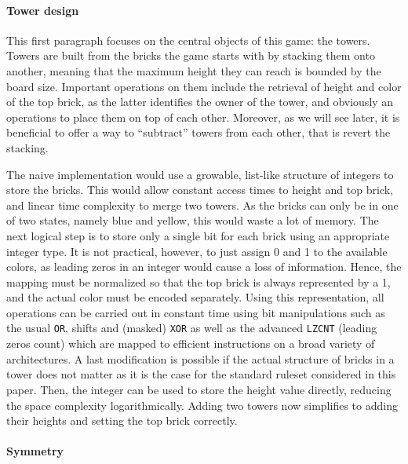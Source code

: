 \documentclass[sigconf]{acmart}
\begin{document}
\paragraph{Tower design}
This first paragraph focuses on the central objects of this game: the towers.
Towers are built from the bricks the game starts with by stacking them onto another, meaning that the maximum height they can reach is bounded by the board size.
Important operations on them include the retrieval of height and color of the top brick, as the latter identifies the owner of the tower, and obviously an operations to place them on top of each other.
Moreover, as we will see later, it is beneficial to offer a way to \enquote{subtract} towers from each other, that is revert the stacking.

The naive implementation would use a growable, list-like structure of integers to store the bricks.
This would allow constant access times to height and top brick, and linear time complexity to merge two towers.
As the bricks can only be in one of two states, namely blue and yellow, this would waste a lot of memory.
The next logical step is to store only a single bit for each brick using an appropriate integer type.
It is not practical, however, to just assign 0 and 1 to the available colors, as leading zeros in an integer would cause a loss of information.
Hence, the mapping must be normalized so that the top brick is always represented by a 1, and the actual color must be encoded separately.
Using this representation, all operations can be carried out in constant time using bit manipulations such as the usual \texttt{OR}, shifts and (masked) \texttt{XOR} as well as the advanced \texttt{LZCNT} (leading zeros count) which are mapped to efficient instructions on a broad variety of architectures.
A last modification is possible if the actual structure of bricks in a tower does not matter as it is the case for the standard ruleset considered in this paper.
Then, the integer can be used to store the height value directly, reducing the space complexity logarithmically.
Adding two towers now simplifies to adding their heights and setting the top brick correctly.

\paragraph{Symmetry}
\end{document}

